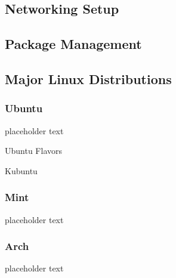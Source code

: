 \documentclass[10pt]{article}
\begin{document}
  \subsection{Networking Setup}

  \subsection{Package Management}

  \subsection{Major Linux Distributions}

    \subsubsection{Ubuntu}

      placeholder text 

      \begin{core}{Ubuntu Flavors}

        Kubuntu

      \end{core}

    \subsubsection{Mint}

      placeholder text

    \subsubsection{Arch}

      placeholder text

 
\end{document}
